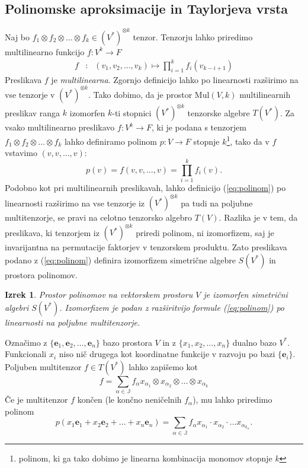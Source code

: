 \documentclass{article}
\newcommand{\JJ}{\mathbb{J}}
\newcommand{\e}{\mathbf{e}}
\newtheorem{izrek}{Izrek}[section]
\begin{document}
\subsection{Polinomske aproksimacije in Taylorjeva vrsta}
Naj bo $f_1\otimes f_2\otimes \ldots \otimes f_k\in (V^*)^{\otimes k}$
tenzor. Tenzorju lahko priredimo multilinearno funkcijo $f:V^k\to F$ 
\begin{eqnarray}
  \label{eq:multilinear}
f&:&(v_1,v_2,\ldots,v_k) \mapsto \prod_{i=1}^k f_i(v_{k-i+1}) 
\end{eqnarray}
Preslikava $f$ je \emph{multilinearna}. Zgornjo definicijo lahko po linearnosti
razširimo na vse tenzorje v $(V^*)^{\otimes k}$. Tako dobimo, da je prostor
$\mathrm{Mul}(V,k)$ multilinearnih preslikav ranga $k$ izomorfen $k$-ti stopnici
$(V^*)^{\otimes k}$ tenzorske algebre $T(V^*)$. 
Za vsako multilinearno preslikavo $f:V^k\to F$, ki je podana s tenzorjem
$f_1\otimes f_2\otimes\ldots \otimes f_k$ lahko definiramo polinom $p:V\to
F$ stopnje $k$\footnote{polinom, ki ga tako dobimo je linearna kombinacija monomov stopnje $k$}, tako da v $f$ vstavimo $(v,v,\ldots, v)$:
\begin{equation}
  \label{eq:polinom}
  p(v) = f(v,v,\ldots, v) = \prod_{i=1}^kf_i(v).
\end{equation}
Podobno kot pri multilinearnih preslikavah, lahko definicijo (\ref{eq:polinom})
po linearnosti razširimo na vse tenzorje iz $(V^*)^{\otimes k}$ pa tudi na
poljubne multitenzorje, se pravi na celotno tenzorsko algebro $T(V)$. Razlika je v
tem, da preslikava, ki tenzorjem iz $(V^*)^{\otimes k}$ priredi polinom, ni
izomorfizem, saj je invarijantna na permutacije faktorjev v tenzorskem
produktu. Zato preslikava podano z (\ref{eq:polinom}) definira izomorfizem
simetrične algebre $S(V^*)$ in prostora polinomov.
\begin{izrek}
  Prostor polinomov na vektorskem prostoru $V$ je izomorfen simetrični algebri
  $S(V^*)$. Izomorfizem je podan z razširitvijo formule (\ref{eq:polinom}) po
  linearnosti na poljubne multitenzorje.
\end{izrek}
Označimo z $\{\e_1,\e_2,\ldots,\e_n\}$ bazo prostora $V$ in z $\{x_1,x_2,\ldots,
x_n\}$ dualno bazo $V^*$. Funkcionali $x_i$ niso nič drugega kot koordinatne
funkcije v razvoju po bazi $\{\e_i\}$. Poljuben multitenzor $f\in T(V^*)$ lahko
zapišemo kot 
$$f = \sum_{\alpha \in \JJ}f_\alpha x_{\alpha_1}\otimes
x_{\alpha_2}\otimes\ldots \otimes x_{\alpha_k}$$
Če je multitenzor $f$ končen (le končno neničelnih $f_\alpha$),  mu lahko
priredimo polinom 
$$p(x_1\e_1+x_2\e_2+\ldots +x_n\e_n)=\sum_{\alpha \in \JJ}f_\alpha x_{\alpha_1}\cdot
x_{\alpha_2}\cdot\ldots  x_{\alpha_{k_\alpha}}.$$
 
\end{document}
